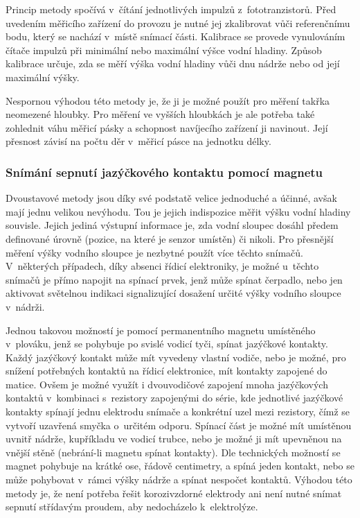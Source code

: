             Princip metody spočívá v~čítání jednotlivých impulzů z~fototranzistorů. Před uvedením měřicího zařízení do provozu je nutné jej zkalibrovat vůči referenčnímu bodu, který se nachází v~místě snímací části. Kalibrace se provede vynulováním čítače impulzů při minimální nebo maximální výšce vodní hladiny. Způsob kalibrace určuje, zda se měří výška vodní hladiny vůči dnu nádrže nebo od její maximální výšky.

            Nespornou výhodou této metody je, že ji je možné použít pro měření takřka neomezené hloubky. Pro měření ve vyšších hloubkách je ale potřeba také zohlednit váhu měřicí pásky a schopnost navíjecího zařízení ji navinout. Její přesnost závisí na počtu děr v~měřicí pásce na jednotku délky. 

        \subsubsection{Snímání sepnutí jazýčkového kontaktu pomocí magnetu}
            Dvoustavové metody jsou díky své podstatě velice jednoduché a účinné, avšak mají jednu velikou nevýhodu. Tou je jejich indispozice měřit výšku vodní hladiny souvisle. Jejich jediná výstupní informace je, zda vodní sloupec dosáhl předem definované úrovně (pozice, na které je senzor umístěn) či nikoli. Pro přesnější měření výšky vodního sloupce je nezbytné použít více těchto snímačů. V~některých případech, díky absenci řídicí elektroniky, je možné u~těchto snímačů je přímo napojit na spínací prvek, jenž může spínat čerpadlo, nebo jen aktivovat světelnou indikaci signalizující dosažení určité výšky vodního sloupce v~nádrži. 

            Jednou takovou možností je pomocí permanentního magnetu umístěného v~plováku, jenž se pohybuje po svislé vodicí tyči, spínat jazýčkové kontakty. Každý jazýčkový kontakt může mít vyvedeny vlastní vodiče, nebo je možné, pro snížení potřebných kontaktů na řídicí elektronice, mít kontakty zapojené do matice. Ovšem je možné využít i dvouvodičové zapojení mnoha jazýčkových kontaktů v~kombinaci s~rezistory zapojenými do série, kde jednotlivé jazýčkové kontakty spínají jednu elektrodu snímače a konkrétní uzel mezi rezistory, čímž se vytvoří uzavřená smyčka o~určitém odporu.
            Spínací část je možné mít umístěnou uvnitř nádrže, kupříkladu ve vodicí trubce, nebo je možné ji mít upevněnou na vnější stěně (nebrání-li magnetu spínat kontakty). Dle technických možností se magnet pohybuje na krátké ose, řádově centimetry, a spíná jeden kontakt, nebo se může pohybovat v~rámci výšky nádrže a spínat nespočet kontaktů. Výhodou této metody je, že není potřeba řešit korozivzdorné elektrody ani není nutné snímat sepnutí střídavým proudem, aby nedocházelo k~elektrolýze. 

